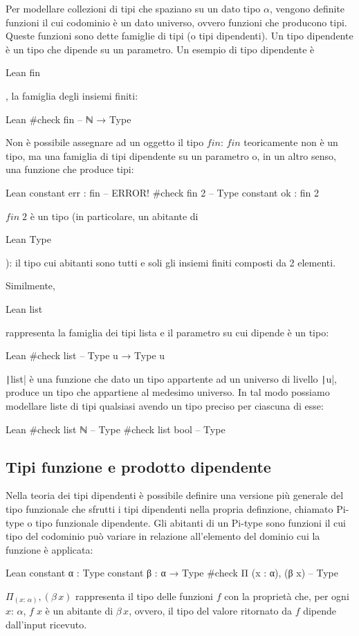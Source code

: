 Per modellare collezioni di tipi che spaziano su un dato tipo $\alpha$, vengono definite funzioni il cui codominio è un dato universo, ovvero funzioni che producono tipi. Queste funzioni sono dette famiglie di tipi (o tipi dipendenti). Un tipo dipendente è un tipo che dipende su un parametro. Un esempio di tipo dipendente è \begin{mintinline}{Lean} fin \end{mintinline}, la famiglia degli insiemi finiti:
\begin{code}{Lean}
#check fin -- ℕ → Type
\end{code}
Non è possibile assegnare ad un oggetto il tipo $fin$: $fin$ teoricamente non è un tipo, ma una famiglia di tipi dipendente su un parametro o, in un altro senso, una funzione che produce tipi:
\begin{code}{Lean}
constant err : fin -- ERROR!
#check fin 2 -- Type
constant ok : fin 2
\end{code}
$fin\;2$ è un tipo (in particolare, un abitante di \begin{mintinline}{Lean} Type \end{mintinline}): il tipo cui abitanti sono tutti e soli gli insiemi finiti composti da 2 elementi.

Similmente, \begin{mintinline}{Lean} list \end{mintinline} rappresenta la famiglia dei tipi lista e il parametro su cui dipende è un tipo:
\begin{code}{Lean}
#check list -- Type u → Type u
\end{code}
\texttt|list| è una funzione che dato un tipo appartente ad un universo di livello \texttt|u|, produce un tipo che appartiene al medesimo universo. In tal modo possiamo modellare liste di tipi qualsiasi avendo un tipo preciso per ciascuna di esse:
\begin{code}{Lean}
#check list ℕ -- Type
#check list bool -- Type
\end{code}

\subsection{Tipi funzione e prodotto dipendente}
Nella teoria dei tipi dipendenti è possibile definire una versione più generale del tipo funzionale che sfrutti i tipi dipendenti nella propria definzione, chiamato Pi-type o tipo funzionale dipendente. Gli abitanti di un Pi-type sono funzioni il cui tipo del codominio può variare in relazione all'elemento del dominio cui la funzione è applicata:
\begin{code}{Lean}
constant α : Type
constant β : α → Type
#check Π (x : α), (β x) -- Type
\end{code}
$\Pi_{(x:\,\alpha)}, (\beta\,x)$ rappresenta il tipo delle funzioni $f$ con la proprietà che, per ogni $x:\,\alpha$, $f\;x$ è un abitante di $\beta\,x$, ovvero, il tipo del valore ritornato da $f$ dipende dall'input ricevuto.

